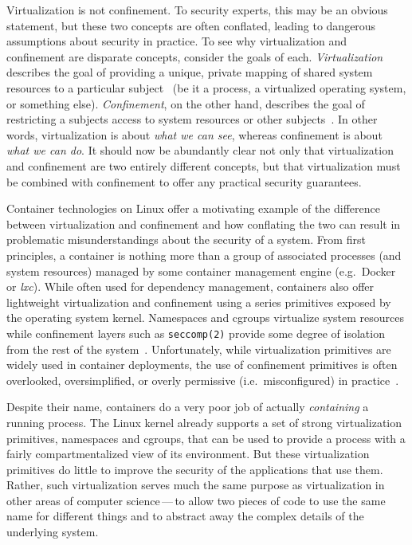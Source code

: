 \begin{inprogress}
Virtualization is not confinement. To security experts, this may be an obvious statement,
but these two concepts are often conflated, leading to dangerous assumptions about
security in practice. To see why virtualization and confinement are disparate concepts,
consider the goals of each. \textit{Virtualization} describes the goal of providing
a unique, private mapping of shared system resources to a particular subject~
(be it a process, a virtualized operating system, or something else).
\textit{Confinement}, on the other hand, describes the goal of restricting a subjects
access to system resources or other subjects~. In other words, virtualization
is about \textit{what we can see}, whereas confinement is about \textit{what we can do}.
It should now be abundantly clear not only that virtualization and confinement are two
entirely different concepts, but that virtualization must be combined with confinement to
offer any practical security guarantees.

Container technologies on Linux offer a motivating example of the difference between
virtualization and confinement and how conflating the two can result in problematic
misunderstandings about the security of a system. From first principles, a container is
nothing more than a group of associated processes (and system resources) managed by some
container management engine (e.g.~Docker or \textit{lxc}). While often used for dependency
management, containers also offer lightweight virtualization and confinement using
a series primitives exposed by the operating system kernel.  Namespaces and cgroups
virtualize system resources while confinement layers such as \texttt{seccomp(2)} provide
some degree of isolation from the rest of the system~. Unfortunately, while
virtualization primitives are widely used in container deployments, the use of confinement
primitives is often overlooked, oversimplified, or overly permissive (i.e.~misconfigured)
in practice~.

Despite their name, containers do a very poor job of actually \textit{containing}
a running process.  The Linux kernel already supports a set of strong virtualization
primitives, namespaces and cgroups, that can be used to provide a process with a fairly
compartmentalized view of its environment. But these virtualization primitives do little
to improve the security of the applications that use them. Rather, such virtualization
serves much the same purpose as virtualization in other areas of computer science\,---\,to
allow two pieces of code to use the same name for different things and to abstract away
the complex details of the underlying system.


\end{inprogress}

